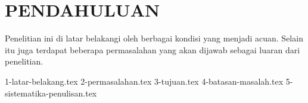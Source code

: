 \chapter{PENDAHULUAN}
\label{chap:pendahuluan}

Penelitian ini di latar belakangi oleh berbagai kondisi yang menjadi acuan.
Selain itu juga terdapat beberapa permasalahan yang akan dijawab sebagai luaran dari penelitian.

{1-latar-belakang.tex}
{2-permasalahan.tex}
{3-tujuan.tex}
{4-batasan-masalah.tex}
{5-sistematika-penulisan.tex}
